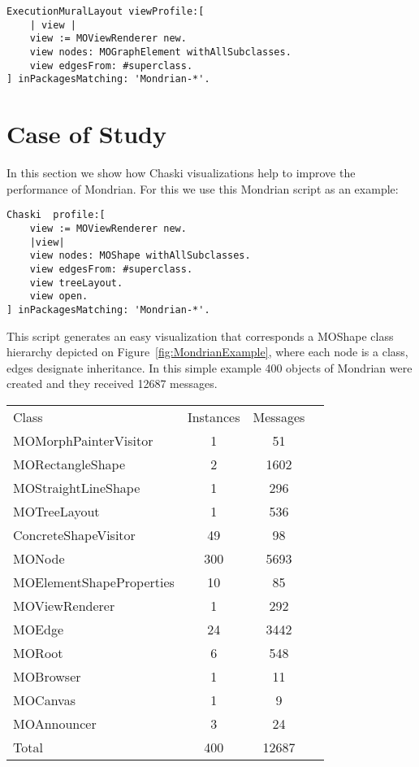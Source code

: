 \documentclass{sig-alternate}
\newcommand{\ab}[1]{\nb{Alexandre}{blue}{#1}}
\newcommand{\seclabel}[1]{\label{sec:#1}}
\newcommand{\figref}[1]{Figure~\ref{fig:#1}}
\begin{document}
\ab{Why not:}
\begin{lstlisting}[language=Smalltalk]
ExecutionMuralLayout viewProfile:[
	| view |
	view := MOViewRenderer new.
	view nodes: MOGraphElement withAllSubclasses.
	view edgesFrom: #superclass.
] inPackagesMatching: 'Mondrian-*'.
\end{lstlisting}




\section{Case of Study}\seclabel{caseStudy}

In this section we show how Chaski visualizations help to improve the performance of Mondrian.
For this we use this Mondrian script as an example:
\begin{lstlisting}[language=Smalltalk]
Chaski  profile:[
	view := MOViewRenderer new.
	|view|
	view nodes: MOShape withAllSubclasses.
	view edgesFrom: #superclass.
	view treeLayout.
	view open.
] inPackagesMatching: 'Mondrian-*'.
\end{lstlisting}

This script generates an easy visualization that corresponds a MOShape class hierarchy depicted on \figref{MondrianExample}, where each node is a class, edges designate inheritance. In this simple example 400 objects of Mondrian were created and they received 12687 messages.

\begin{center}
   \begin{tabular}{|l||ccr|} \hline
	Class & Instances & Messages \\
	MOMorphPainterVisitor & 1 & 51	\\
	MORectangleShape & 2 & 1602	\\
	MOStraightLineShape & 1 & 296	\\
	MOTreeLayout & 1 & 536	\\
	ConcreteShapeVisitor & 49 & 98 \\
	MONode & 300 & 5693\\
	MOElementShapeProperties & 10 & 85\\
	MOViewRenderer & 1 & 292\\
	MOEdge & 24 & 3442\\
	MORoot & 6 & 548\\
	MOBrowser & 1 & 11\\
	MOCanvas & 1 & 9\\
	MOAnnouncer & 3 & 24\\
	Total & 400 & 12687 \\
   \end{tabular}
\end{center}
\end{document}
